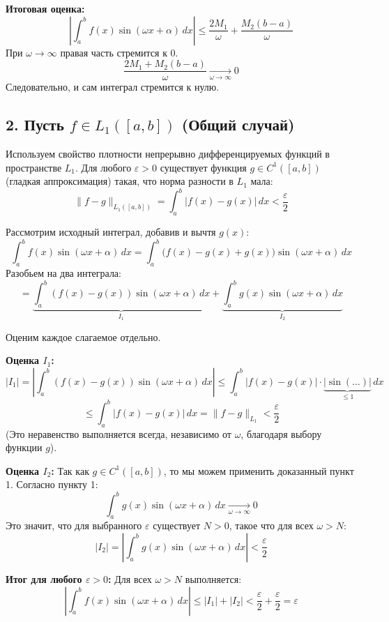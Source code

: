\documentclass[12pt,a4paper,openany]{book}
\begin{document}
\textbf{Итоговая оценка:}
$$ \left| \int_a^b f(x) \sin(\omega x + \alpha) \, dx \right| \le \frac{2M_1}{\omega} + \frac{M_2(b - a)}{\omega} $$
При $\omega \to \infty$ правая часть стремится к 0.
$$ \frac{2M_1 + M_2(b-a)}{\omega} \xrightarrow[\omega \to \infty]{} 0 $$
Следовательно, и сам интеграл стремится к нулю.

\vspace{1cm}

\subsection*{2. Пусть $f \in L_1([a, b])$ (Общий случай)}

Используем свойство плотности непрерывно дифференцируемых функций в пространстве $L_1$.
Для любого $\varepsilon > 0$ существует функция $g \in C^1([a, b])$ (гладкая аппроксимация) такая, что норма разности в $L_1$ мала:
$$ \| f - g \|_{L_1([a, b])} = \int_a^b |f(x) - g(x)| \, dx < \frac{\varepsilon}{2} $$

Рассмотрим исходный интеграл, добавив и вычтя $g(x)$:
$$ \int_a^b f(x) \sin(\omega x + \alpha) \, dx = \int_a^b \big( f(x) - g(x) + g(x) \big) \sin(\omega x + \alpha) \, dx $$
Разобьем на два интеграла:
$$ = \underbrace{\int_a^b (f(x) - g(x)) \sin(\omega x + \alpha) \, dx}_{I_1} + \underbrace{\int_a^b g(x) \sin(\omega x + \alpha) \, dx}_{I_2} $$

Оценим каждое слагаемое отдельно.

\textbf{Оценка $I_1$:}
$$ |I_1| = \left| \int_a^b (f(x) - g(x)) \sin(\omega x + \alpha) \, dx \right| \le \int_a^b |f(x) - g(x)| \cdot \underbrace{|\sin(\dots)|}_{\le 1} \, dx $$
$$ \le \int_a^b |f(x) - g(x)| \, dx = \| f - g \|_{L_1} < \frac{\varepsilon}{2} $$
(Это неравенство выполняется всегда, независимо от $\omega$, благодаря выбору функции $g$).

\textbf{Оценка $I_2$:}
Так как $g \in C^1([a, b])$, то мы можем применить доказанный пункт 1. Согласно пункту 1:
$$ \int_a^b g(x) \sin(\omega x + \alpha) \, dx \xrightarrow[\omega \to \infty]{} 0 $$
Это значит, что для выбранного $\varepsilon$ существует $N > 0$, такое что для всех $\omega > N$:
$$ |I_2| = \left| \int_a^b g(x) \sin(\omega x + \alpha) \, dx \right| < \frac{\varepsilon}{2} $$

\textbf{Итог для любого $\varepsilon > 0$:}
Для всех $\omega > N$ выполняется:
$$ \left| \int_a^b f(x) \sin(\omega x + \alpha) \, dx \right| \le |I_1| + |I_2| < \frac{\varepsilon}{2} + \frac{\varepsilon}{2} = \varepsilon $$
\end{document}
